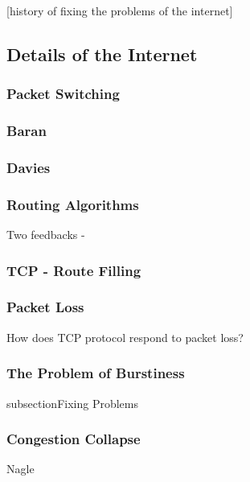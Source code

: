 [history of fixing the problems of the internet]

\subsection{Details of the Internet}


\subsubsection{Packet Switching}

\subsubsection{Baran}
\subsubsection{Davies}

\subsubsection{Routing Algorithms}

Two feedbacks - 

\subsubsection{TCP - Route Filling}

\subsubsection{Packet Loss}

How does TCP protocol respond to packet loss?

\subsubsection{The Problem of Burstiness} 

subsection{Fixing Problems}

\subsubsection{Congestion Collapse}



Nagle \cite{nagle1984}

